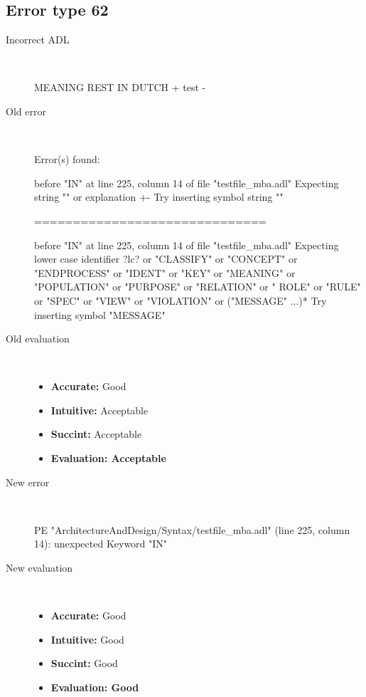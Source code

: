 \subsection{Error type 62}
  \begin{description}
  \item[Incorrect ADL]~\\
\begin{adl}
MEANING REST IN DUTCH  {+ test -}\end{adl}
  \item[Old error]~\\
\begin{haskell}
Error(s) found:

before "IN" at line 225, column 14 of file "testfile_mba.adl"
Expecting string "" or explanation {+-}
Try inserting symbol string ""

==============================

before "IN" at line 225, column 14 of file "testfile_mba.adl"
Expecting lower case identifier ?lc? or "CLASSIFY" or "CONCEPT" or "ENDPROCESS"
or "IDENT" or "KEY" or "MEANING" or "POPULATION" or "PURPOSE" or "RELATION" or "
ROLE" or "RULE" or "SPEC" or "VIEW" or "VIOLATION" or ("MESSAGE" ...)*
Try inserting symbol "MESSAGE"\end{haskell}
  \item[Old evaluation]~\\
    \begin{itemize}
    \item \textbf{Accurate:} Good
    \item \textbf{Intuitive:} Acceptable
    \item \textbf{Succint:} Acceptable
    \item \textbf{Evaluation: Acceptable}
    \end{itemize}
  \item[New error]~\\
\begin{haskell}
PE "ArchitectureAndDesign/Syntax/testfile_mba.adl" (line 225, column 14):
unexpected Keyword "IN"\end{haskell}
  \item[New evaluation]~\\
    \begin{itemize}
    \item \textbf{Accurate:} Good
    \item \textbf{Intuitive:} Good
    \item \textbf{Succint:} Good
    \item \textbf{Evaluation: Good
}
    \end{itemize}
  \end{description}

